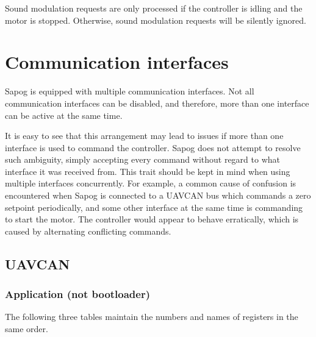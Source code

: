 \documentclass{zubaxdoc}
\begin{document}
Sound modulation requests are only processed if the controller is idling and the motor is stopped.
Otherwise, sound modulation requests will be silently ignored.

\chapter{Communication interfaces}\label{sec:communication_interfaces}

Sapog is equipped with multiple communication interfaces.
Not all communication interfaces can be disabled,
and therefore, more than one interface can be active at the same time.

It is easy to see that this arrangement may lead to issues if more than one
interface is used to command the controller.
Sapog does not attempt to resolve such ambiguity, simply accepting every command
without regard to what interface it was received from.
This trait should be kept in mind when using multiple interfaces concurrently.
For example, a common cause of confusion is encountered when Sapog is connected to a
UAVCAN bus which commands a zero setpoint periodically,
and some other interface at the same time is commanding to start the motor.
The controller would appear to behave erratically,
which is caused by alternating conflicting commands.

\section{UAVCAN}
\subsection{Application (not bootloader)}
The following three tables maintain the numbers and names of registers in the same order.
\end{document}
